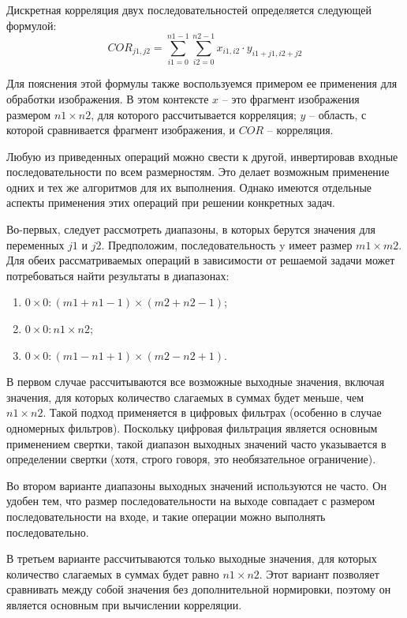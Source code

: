 Дискретная корреляция двух последовательностей определяется следующей формулой: 
\begin{equation}
	\label{eq:equation3.5.2}
	COR_{j1,j2} = \sum_{i1 =0}^{n1-1} \sum_{i2 =0}^{n2-1} x_{i1,i2} \cdot y_{i1+j1,i2+j2}
\end{equation}

Для пояснения этой формулы также воспользуемся примером ее применения для обработки изображения. В этом контексте $x$ – это фрагмент изображения размером $ n1 \times n2 $, для которого рассчитывается корреляция; $y$ – область, с которой сравнивается фрагмент изображения, и $COR$ – корреляция.

Любую из приведенных операций можно свести к другой, инвертировав входные последовательности по всем размерностям. Это делает возможным применение одних и тех же алгоритмов для их выполнения. Однако имеются
отдельные аспекты применения этих операций при решении конкретных задач.

Во-первых, следует рассмотреть диапазоны, в которых берутся значения для переменных $j1$ и $j2$. Предположим, последовательность y имеет размер $m1 \times m2$. Для обеих рассматриваемых операций в зависимости от решаемой задачи может потребоваться найти результаты в диапазонах: 
\begin{enumerate}
	\item $0 \times 0: (m1 + n1 - 1) \times (m2 + n2 - 1)$;
	
	\item	$0 \times 0: n1 \times n2$;
	
	\item $0 \times 0: (m1 - n1 + 1) \times (m2 - n2 + 1)$. 
\end{enumerate}

В первом случае рассчитываются все возможные выходные значения, включая значения, для которых количество слагаемых в суммах будет меньше, чем $n1 \times n2$. Такой подход применяется в цифровых фильтрах (особенно в случае одномерных фильтров). Поскольку цифровая фильтрация является основным применением свертки, такой диапазон выходных значений часто указывается в определении свертки (хотя, строго говоря, это необязательное ограничение).

Во втором варианте диапазоны выходных значений используются не часто. Он удобен тем, что размер последовательности на выходе совпадает с размером последовательности на входе, и такие операции можно выполнять
последовательно.

В третьем варианте рассчитываются только выходные значения, для которых количество слагаемых в суммах будет равно $n1 \times n2$. Этот вариант позволяет сравнивать между собой значения без дополнительной нормировки, поэтому он является основным при вычислении корреляции.

